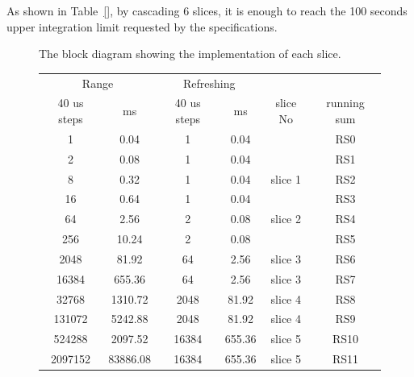 \documentclass{llncs}
\begin{document}
As shown in Table~\ref{}, by cascading 6 slices, it is enough to reach the 100 seconds upper integration limit requested by the specifications.

\begin{figure}[t]
  \centering {}
   \caption{The block diagram showing the implementation of each slice.}
  \label{fig:slice}
\end{figure}


\begin{figure}[t]
\centering
\begin{tabular}{|c|c|c|c|c|c|}
\hline
\multicolumn{2}{|c}{Range} &\multicolumn{2}{|c|}{Refreshing} & & \\\cline{1-4}
40 us steps & ms & 40 us steps  & ms & slice No & running sum \\\hline\hline
1 & 0.04 & 1 & 0.04 & & RS0 \\\hline
2 & 0.08 & 1 & 0.04 & & RS1 \\\hline
8 & 0.32 & 1 & 0.04 & slice 1 & RS2 \\\hline
16 & 0.64 & 1 & 0.04 & & RS3 \\\hline
64 & 2.56 & 2 & 0.08 & slice 2 & RS4 \\\hline
256 & 10.24 & 2 & 0.08 & & RS5 \\\hline
2048 & 81.92 & 64 & 2.56 &slice  3 & RS6 \\\hline
16384 & 655.36 & 64 & 2.56 &slice 3 & RS7 \\\hline
32768 &1310.72 & 2048 & 81.92 & slice 4 & RS8 \\\hline
131072 & 5242.88 & 2048 & 81.92 & slice 4 & RS9 \\\hline
524288 & 2097.52 & 16384 & 655.36 & slice 5 &RS10 \\\hline
2097152 & 83886.08 & 16384 & 655.36 & slice 5 & RS11 \\\hline

\end{tabular}
\vspace{0.04in}
\label{fig:example-bakery}
\caption{}
\end{figure}
\end{document}
